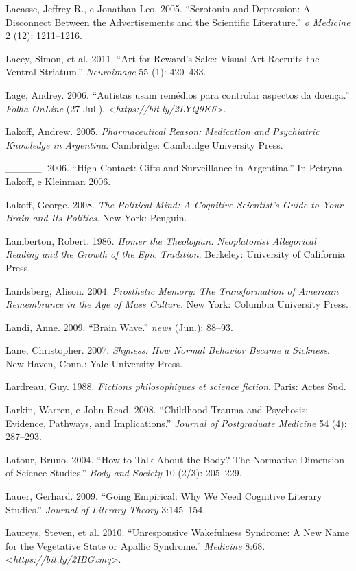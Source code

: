 {\begin{Parskip}
Lacasse, Jeffrey R., e Jonathan Leo. 2005. ``Serotonin and Depression: A
Disconnect Between the Advertisements and the Scientific Literature.''
\emph{o Medicine} 2 (12): 1211--1216.

Lacey, Simon, et al. 2011. ``Art for Reward's Sake: Visual Art Recruits
the Ventral Striatum.'' \emph{Neuroimage} 55 (1): 420--433.

Lage, Andrey. 2006. ``Autistas usam remédios para controlar aspectos da
doença.'' \emph{Folha OnLine} (27 Jul.).
\textless{}\emph{https://bit.ly/2LYQ9K6}\textgreater{}.

Lakoff, Andrew. 2005. \emph{Pharmaceutical Reason: Medication and
Psychiatric Knowledge in Argentina}. Cambridge: Cambridge University
Press.

\_\_\_\_\_. 2006. ``High Contact: Gifts and Surveillance in Argentina.''
In Petryna, Lakoff, e Kleinman 2006.

Lakoff, George. 2008. \emph{The Political Mind: A Cognitive Scientist's
Guide to Your Brain and Its Politics}. New York: Penguin.

Lamberton, Robert. 1986. \emph{Homer the Theologian: Neoplatonist
Allegorical Reading and the Growth of the Epic Tradition}. Berkeley:
University of California Press.

Landsberg, Alison. 2004. \emph{Prosthetic Memory: The Transformation of
American Remembrance in the Age of Mass Culture.} New York: Columbia
University Press.

Landi, Anne. 2009. ``Brain Wave.'' \emph{news} (Jun.): 88--93.

Lane, Christopher. 2007. \emph{Shyness: How Normal Behavior Became a
Sickness}. New Haven, Conn.: Yale University Press.

Lardreau, Guy. 1988. \emph{Fictions philosophiques et science fiction}.
Paris: Actes Sud.

Larkin, Warren, e John Read. 2008. ``Childhood Trauma and Psychosis:
Evidence, Pathways, and Implications.'' \emph{Journal of Postgraduate
Medicine} 54 (4): 287--293.

Latour, Bruno. 2004. ``How to Talk About the Body? The Normative
Dimension of Science Studies.'' \emph{Body and Society} 10 (2/3):
205--229.

Lauer, Gerhard. 2009. ``Going Empirical: Why We Need Cognitive Literary
Studies.'' \emph{Journal of Literary Theory} 3:145--154.

Laureys, Steven, et al. 2010. ``Unresponsive Wakefulness Syndrome: A New
Name for the Vegetative State or Apallic Syndrome.'' \emph{ Medicine}
8:68. \textless{}\emph{https://bit.ly/2IBGxmq}\textgreater{}.


\end{Parskip}}
